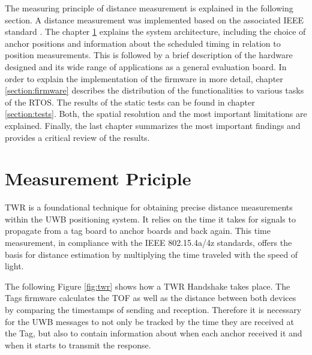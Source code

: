 \documentclass[conference, a4paper]{IEEEtran}
\begin{document}
The measuring principle of distance measurement is explained in the following section.
A distance measurement was implemented based on the associated IEEE standard  \cite{IEEE802154a} \cite{IEEE802154z}.
The chapter \ref{Section:principle} explains the system architecture,
including the choice of anchor positions and 
information about the scheduled timing in relation to position measurements.
This is followed by a brief description of the hardware designed and
its wide range of applications as a general evaluation board.
In order to explain the implementation of the firmware in more detail,
chapter \ref{section:firmware} describes the distribution of the functionalities to various tasks of the \ac{RTOS}.
The results of the static tests can be found in chapter \ref{section:tests}.
Both, the spatial resolution and the most important limitations are explained.
Finally, the last chapter summarizes the most important findings and provides a critical review of the results.



\section{Measurement Priciple}\label{Section:principle}
\acf{TWR} is a foundational technique for obtaining precise distance measurements within the UWB positioning system.
It relies on the time it takes for signals to propagate from a tag board to anchor boards and back again.
This time measurement, in compliance with the IEEE 802.15.4a/4z standards, offers the basis for distance estimation by multiplying the time traveled with the speed of light.

The following Figure \ref{fig:twr} shows how a \ac{TWR} Handshake takes place.
The Tags firmware calculates the \acf{TOF} as well as the distance between both devices by comparing the timestamps of sending and reception. 
Therefore it is necessary for the \ac{UWB} messages to not only be tracked by the time they are received at the Tag, but also to contain information about when each anchor received it and when it starts to transmit the response. 
\end{document}
